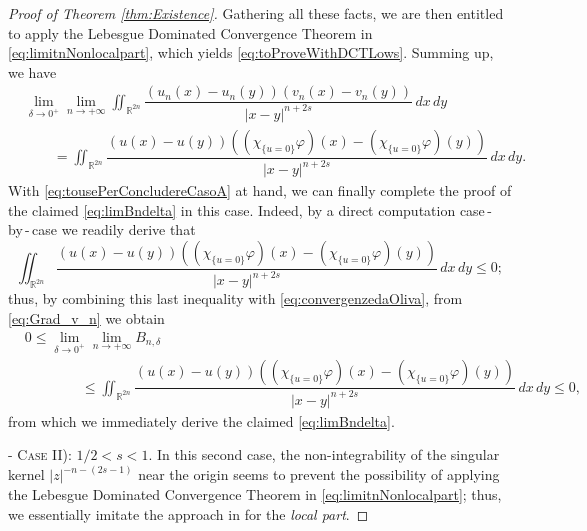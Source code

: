 \documentclass[11pt,a4paper]{amsart}
\def \R {\mathbb{R}}
\theoremstyle{definition}
\theoremstyle{plain}
\numberwithin{equation}{section}
\begin{document}
{\begin{proof}[Proof of Theorem \ref{thm:Existence}]
Gathering all these facts, we are then entitled to apply the 
Le\-be\-sgue Dominated Convergence Theorem in \eqref{eq:limitnNonlocalpart},
which yields \eqref{eq:toProveWithDCTLows}. Summing up, we have
\begin{equation} \label{eq:tousePerConcludereCasoA}
\begin{split}
& \lim_{\delta\to 0^+}
\lim_{n\to+\infty}
 \iint_{\R^{2n}}\dfrac{(u_n(x)-u_n(y))(v_n(x)-v_n(y))}{|x-y|^{n+2s}}\,dx\,dy \\
 & \qquad
 = \iint_{\R^{2n}}\dfrac{(u(x)-u(y))((\chi_{\{u = 0\}}\varphi)(x)-
 (\chi_{\{u = 0\}}\varphi)(y))}{|x-y|^{n+2s}}\,dx\,dy.
 \end{split}
\end{equation}
With \eqref{eq:tousePerConcludereCasoA} at hand, we can finally complete
the proof
of the claimed \eqref{eq:limBndelta} in this case. Indeed, by a direct computation case\,-\,by\,-\,case
we readily derive that
$$\iint_{\R^{2n}}\dfrac{(u(x)-u(y))((\chi_{\{u = 0\}}\varphi)(x)-
 (\chi_{\{u = 0\}}\varphi)(y))}{|x-y|^{n+2s}}\,dx\,dy\leq 0;$$
 thus, by combining this last inequality with \eqref{eq:convergenzedaOliva}, from
 \eqref{eq:Grad_v_n} we obtain
 \begin{align*}
  & 0\leq \lim_{\delta\to 0^+}\lim_{n\to+\infty}
  B_{n,\delta}\\
  & \qquad\qquad\leq \iint_{\R^{2n}}\dfrac{(u(x)-u(y))((\chi_{\{u = 0\}}\varphi)(x)-
 (\chi_{\{u = 0\}}\varphi)(y))}{|x-y|^{n+2s}}\,dx\,dy\leq 0,
 \end{align*}
 from which we immediately derive the claimed \eqref{eq:limBndelta}.
 \medskip
 
 -\,\,\textsc{Case II): $1/2<s<1$}. In this second case, the non-integrability of the 
 singular kernel $|z|^{-n-(2s-1)}$
 near the origin seems to prevent the possibility of applying the
 Lebesgue Dominated Convergence Theorem
 in \eqref{eq:limitnNonlocalpart}; thus, we essentially imitate the approach
 in \cite{Oliva} for the \emph{local part}.
 \vspace*{0.1cm}
 

\end{proof}}
\end{document}
